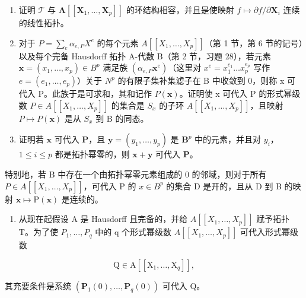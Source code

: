 \begin{enumerate}
\def\labelenumi{(\alph{enumi})}
\item
  证明 \(\mathcal{T}\) 与 \(\mathbf{A}[[\mathbf{X}_1,\dots ,\mathbf{X}_p]]\) 的环结构相容，并且是使映射 \(f\mapsto \partial f / \partial \mathbf{X}_i\) 连续的线性拓扑。
\item
  对于 \(P = \sum_{e} \alpha_{e,P} X^{e}\) 的每个元素 \(A[[X_{1}, \ldots, X_{p}]]\)（第 1 节，第 6 节的记号）以及每个完备 Hausdorff 拓扑 A-代数 B（第 2 节，习题 28），若元素 \(\mathbf{x} = (x_{1}, \ldots, x_{p}) \in B^{p}\) 满足族 \((\alpha_{e,P}\mathbf{x}^{e})\)（这里对 \(x^{e} = x_{1}^{e_{1}} \ldots x_{p}^{e_{p}}\) 写作 \(e = (e_{1}, \ldots, e_{p})\)）关于 \(N^{p}\) 的有限子集补集滤子在 B 中收敛到 0，则称 x 可代入 P。此族于是可求和，其和记作 \(P(\mathbf{x})\)。证明使 x 可代入 P 的形式幂级数 \(P \in A[[X_{1}, \ldots, X_{p}]]\) 的集合是 \(S_{x}\) 的子环 \(A[[X_{1}, \ldots, X_{p}]]\)，且映射 \(P \mapsto P(\mathbf{x})\) 是从 \(S_{x}\) 到 B 的同态。
\item
  证明若 \(\mathbf{x}\) 可代入 \(\mathbf{P}\)，且 \(\mathbf{y} = (y_1, \ldots, y_p)\) 是 \(\mathbf{B}^p\) 中的元素，并且对 \(y_i\)，\(1 \leqslant i \leqslant p\) 都是拓扑幂零的，则 \(\mathbf{x} + \mathbf{y}\) 可代入 \(\mathbf{P}\)。
\end{enumerate}

特别地，若 B 中存在一个由拓扑幂零元素组成的 0 的邻域，则对于所有 \(P \in A[[X_{1}, \ldots, X_{p}]]\)，可代入 P 的 \(x \in B^{p}\) 的集合 D 是开的，且从 D 到 B 的映射 \(\mathbf{x} \mapsto \mathrm{P}(\mathbf{x})\) 是连续的。

\begin{enumerate}
\def\labelenumi{(\alph{enumi})}
\setcounter{enumi}{3}
\tightlist
\item
  从现在起假设 A 是 Hausdorff 且完备的，并给 \(A[[X_{1},\ldots,X_{p}]]\) 赋予拓扑 T。为了使 \(P_{1},\ldots,P_{q}\) 中的 q 个形式幂级数 \(A[[X_{1},\ldots,X_{p}]]\) 可代入形式幂级数
\end{enumerate}

\[
\mathrm{Q} \in \mathrm{A} [ [ \mathrm{X} _ {1}, \dots , \mathrm{X} _ {q} ] ],
\]

其充要条件是系统 \((\mathbf{P}_{1}(0),\ldots,\mathbf{P}_{q}(0))\) 可代入 Q。

